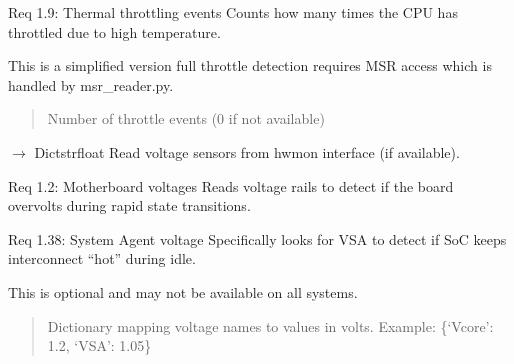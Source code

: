 \documentclass[letterpaper,10pt,english]{sphinxmanual}
\begin{document}
\begin{fulllineitems}
\begin{fulllineitems}
\sphinxAtStartPar
Req 1.9: Thermal throttling events \sphinxhyphen{} Counts how many times
the CPU has throttled due to high temperature.

\sphinxAtStartPar
This is a simplified version \textendash{} full throttle detection
requires MSR access which is handled by msr\_reader.py.
\begin{quote}\begin{description}
\sphinxAtStartPar
Number of throttle events (0 if not available)

\end{description}\end{quote}

\end{fulllineitems}


\begin{fulllineitems}
\label{\detokenize{core.readers.sensor_reader:core.readers.sensor_reader.SensorReader.read_voltages}}
\pysigstartsignatures
\pysiglinewithargsret
{}
{}
{{ $\rightarrow$ Dict\DUrole{p}{{[}}strfloat\DUrole{p}{{]}}}}
\pysigstopsignatures
\sphinxAtStartPar
Read voltage sensors from hwmon interface (if available).

\sphinxAtStartPar
Req 1.2: Motherboard voltages \sphinxhyphen{} Reads voltage rails to detect
if the board over\sphinxhyphen{}volts during rapid state transitions.

\sphinxAtStartPar
Req 1.38: System Agent voltage \sphinxhyphen{} Specifically looks for VSA
to detect if SoC keeps interconnect “hot” during idle.

\sphinxAtStartPar
This is optional and may not be available on all systems.
\begin{quote}\begin{description}
\sphinxAtStartPar
Dictionary mapping voltage names to values in volts.
Example: \{‘Vcore’: 1.2, ‘VSA’: 1.05\}

\end{description}\end{quote}

\end{fulllineitems}


\end{fulllineitems}
\end{document}
